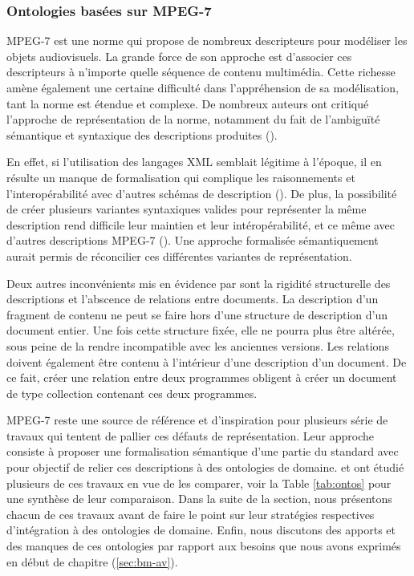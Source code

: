 






\subsubsection{Ontologies basées sur MPEG-7}\label{sec:mpeg7etc}
MPEG-7 est une norme qui propose de nombreux descripteurs pour modéliser les objets audiovisuels.
La grande force de son approche est d'associer ces descripteurs à n'importe quelle séquence de contenu multimédia.
Cette richesse amène également une certaine difficulté dans l'appréhension de sa modélisation, tant la norme est étendue et complexe. 
De nombreux auteurs ont critiqué l'approche de représentation de la norme, notamment du fait de l'ambiguïté sémantique et syntaxique des descriptions produites (\cite{VanOssenbruggen2004, Nack2005a, Troncy2007, Dasiopoulou2009, Arndt2007}).

En effet, si l'utilisation des langages XML semblait légitime à l'époque, il en résulte un manque de formalisation qui complique les raisonnements et l'interopérabilité avec d'autres schémas de description (\cite{Nack2005a}).
De plus, la possibilité de créer plusieurs variantes syntaxiques valides pour représenter la même description rend difficile leur maintien et leur intéropérabilité, et ce même avec d'autres descriptions MPEG-7 (\cite{Arndt2007}).
Une approche formalisée sémantiquement aurait permis de réconcilier ces différentes variantes de représentation. 

Deux autres inconvénients mis en évidence par \cite{Nack2005a} sont la rigidité structurelle des descriptions et l'abscence de relations entre documents. 
La description d'un fragment de contenu ne peut se faire hors d'une structure de description d'un document entier. 
Une fois cette structure fixée, elle ne pourra plus être altérée, sous peine de la rendre incompatible avec les anciennes versions.
Les relations doivent également être contenu à l'intérieur d'une description d'un document.
De ce fait, créer une relation entre deux programmes obligent à créer un document de type collection contenant ces deux programmes.

MPEG-7 reste une source de référence et d'inspiration pour plusieurs série de travaux qui tentent de pallier ces défauts de représentation.
Leur approche consiste à proposer une formalisation sémantique d'une partie du standard avec pour objectif de relier ces descriptions à des ontologies de domaine.
\cite{Troncy2007} et \cite{Dasiopoulou2009} ont étudié plusieurs de ces travaux en vue de les comparer, voir la Table \ref{tab:ontos} pour une synthèse de leur comparaison. 
Dans la suite de la section, nous présentons chacun de ces travaux avant de faire le point sur leur stratégies respectives d'intégration à des ontologies de domaine.
Enfin, nous discutons des apports et des manques de ces ontologies par rapport aux besoins que nous avons exprimés en début de chapitre (\ref{sec:bm-av}).

